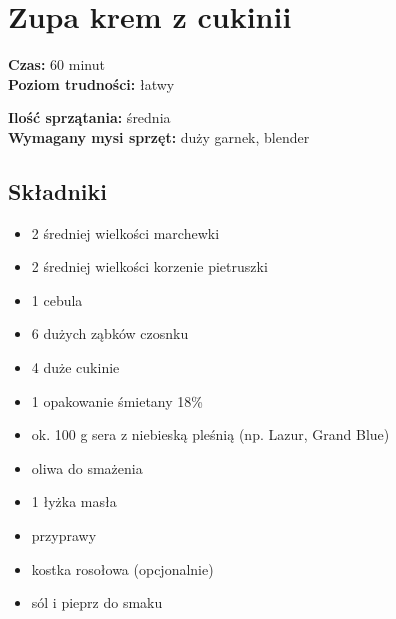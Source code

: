 \documentclass[a4paper,10pt]{book}
\begin{document}
\newpage 
\section{Zupa krem z cukinii}
\bigskip
\small
\begin{minipage}{0.45\textwidth}
    \noindent \textbf{Czas:} 60 minut \\
    \textbf{Poziom trudności:} łatwy
\end{minipage}
\begin{minipage}{0.45\textwidth}
    \noindent \textbf{Ilość sprzątania:} średnia\\
    \textbf{Wymagany mysi sprzęt:} duży garnek, blender
\end{minipage}
\normalsize
\vspace{0.5cm}

\begin{multicols}{2}

\subsection*{Składniki}
\begin{itemize}
    \item 2 średniej wielkości marchewki
    \item 2 średniej wielkości korzenie pietruszki
    \item 1 cebula
    \item 6 dużych ząbków czosnku
    \item 4 duże cukinie
    \item 1 opakowanie śmietany 18\%
    \item ok. 100 g sera z niebieską pleśnią (np. Lazur, Grand Blue)
    \item oliwa do smażenia
    \item 1 łyżka masła
    \item przyprawy
    \item kostka rosołowa (opcjonalnie)
    \item sól i pieprz do smaku
\end{itemize}

\columnbreak

\begin{figure}[H]
    \centering
\end{figure}
\end{multicols}
\end{document}
